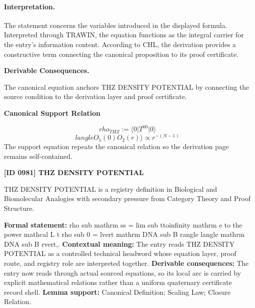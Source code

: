 \paragraph{Interpretation.}
The statement concerns the variables introduced in the displayed formula. Interpreted through TRAWIN, the equation functions as the integral carrier for the entry’s information content. According to CHL, the derivation provides a constructive term connecting the canonical proposition to its proof certificate.

\par\vspace{0.35em}
\noindent\textbf{Derivable Consequences.}\quad
\begingroup
\footnotesize
\raggedright
The canonical equation anchors THZ DENSITY POTENTIAL by connecting the source condition to the derivation layer and proof certificate.
\par\endgroup

\noindent\textbf{Canonical Support Relation}\par
\[
rho_{THZ}:=\langle0|T^{00}\lvert 0 \rangle
\]
\[
langle O_1(0) O_2(r) \rangle \propto r^{-(N-1)}
\]
\noindent The support equation repeats the canonical relation so the derivation page remains self-contained.\par

\clearpage
\noindent\textbf{[ID 0981] THZ DENSITY POTENTIAL}\par
\vspace{0.35em}
\begingroup\small
{}
THZ DENSITY POTENTIAL is a registry definition in Biological and Biomolecular Analogies with secondary pressure from Category Theory and Proof Structure.

\begingroup\footnotesize\setlength{\emergencystretch}{3em}\sloppy
\textbf{Formal statement:} rho sub mathrm ss = lim sub ttoinfinity mathrm e to the power mathcal L t rho sub 0 = lvert mathrm DNA sub B rangle langle mathrm DNA sub B rvert,. \textbf{Contextual meaning:} The entry reads THZ DENSITY POTENTIAL as a controlled technical headword whose equation layer, proof route, and registry role are interpreted together. \textbf{Derivable consequences:} The entry now reads through actual sourced equations, so its local arc is carried by explicit mathematical relations rather than a uniform quaternary certificate record shell. \textbf{Lemma support:} Canonical Definition; Scaling Law; Closure Relation.\par
\endgroup

